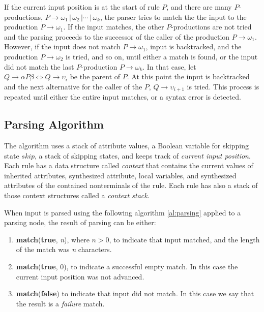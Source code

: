 \documentclass[a4paper,oneside,11pt]{book}
\theoremstyle{definition}
\begin{document}
If the current input position is at the start of rule $P$, and there are many $P$-productions,
$P \rightarrow \omega_1 \,|\, \omega_2 \, | \cdots \, | \, \omega_k$,
the parser tries to match the the input to the production $P \rightarrow \omega_1$.
If the input matches, the other $P$-productions are not tried and the parsing proceeds to the successor of the caller of the production $P \rightarrow \omega_1$.
However, if the input does not match $P \rightarrow \omega_1$, input is backtracked, and the
production $P \rightarrow \omega_2$ is tried, and so on, until either a match is found, or the input did not match the last
$P$-production $P \rightarrow \omega_k$. In that case, let $Q \rightarrow \alpha P \beta \Leftrightarrow Q \rightarrow \upsilon_i$ be the parent of $P$.
At this point the input is backtracked and the next alternative for the caller of the $P$, $Q \rightarrow \upsilon_{i+1}$ is tried.
This process is repeated until either the entire input matches, or a syntax error is detected.

\subsection{Parsing Algorithm}

The algorithm uses a stack of attribute values, a Boolean variable for skipping state $skip$, a stack of skipping states,
and keeps track of \emph{current input position}.
Each rule has a data structure called \emph{context} that contains the current values of inherited attributes,
synthesized attribute, local variables, and synthesized attributes of the contained nonterminals of the rule.
Each rule has also a stack of those context structures called a \emph{context stack}.

When input is parsed using the following algorithm \ref{al:parsing} applied to a parsing node, the result of parsing can be either:

\begin{enumerate}
\item
\textbf{match}(\textbf{true}, \emph{n}), where $n > 0$, to indicate that input matched, and the length of the match was \emph{n} characters.

\item
\textbf{match}(\textbf{true}, 0), to indicate a successful empty match. In this case the current input position was not advanced.

\item
\textbf{match}(\textbf{false}) to indicate that input did not match. In this case we say that the result is a \emph{failure} match.
\end{enumerate}
\end{document}
